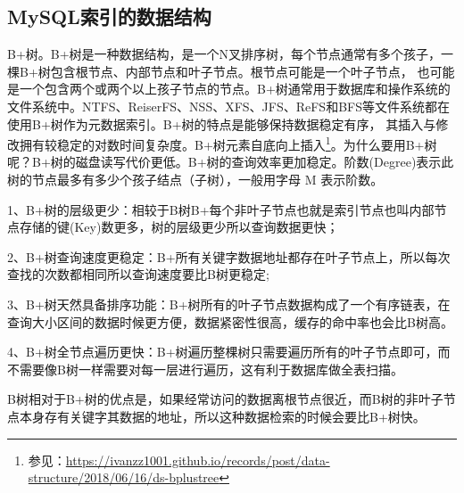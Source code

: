 \documentclass[../../../interview-questions.tex]{subfiles}
\begin{document}
\subsection{MySQL索引的数据结构}

B+树。B+树是一种数据结构，是一个N叉排序树，每个节点通常有多个孩子，一棵B+树包含根节点、内部节点和叶子节点。根节点可能是一个叶子节点， 也可能是一个包含两个或两个以上孩子节点的节点。B+树通常用于数据库和操作系统的文件系统中。NTFS、ReiserFS、NSS、XFS、JFS、ReFS和BFS等文件系统都在使用B+树作为元数据索引。B+树的特点是能够保持数据稳定有序， 其插入与修改拥有较稳定的对数时间复杂度。B+树元素自底向上插入\footnote{参见：\url{https://ivanzz1001.github.io/records/post/data-structure/2018/06/16/ds-bplustree}}。为什么要用B+树呢？B+树的磁盘读写代价更低。B+树的查询效率更加稳定。阶数(Degree)表示此树的节点最多有多少个孩子结点（子树），一般用字母 M 表示阶数。

1、B+树的层级更少：相较于B树B+每个非叶子节点也就是索引节点也叫内部节点存储的键(Key)数更多，树的层级更少所以查询数据更快；

2、B+树查询速度更稳定：B+所有关键字数据地址都存在叶子节点上，所以每次查找的次数都相同所以查询速度要比B树更稳定;

3、B+树天然具备排序功能：B+树所有的叶子节点数据构成了一个有序链表，在查询大小区间的数据时候更方便，数据紧密性很高，缓存的命中率也会比B树高。

4、B+树全节点遍历更快：B+树遍历整棵树只需要遍历所有的叶子节点即可，而不需要像B树一样需要对每一层进行遍历，这有利于数据库做全表扫描。

B树相对于B+树的优点是，如果经常访问的数据离根节点很近，而B树的非叶子节点本身存有关键字其数据的地址，所以这种数据检索的时候会要比B+树快。
\end{document}
